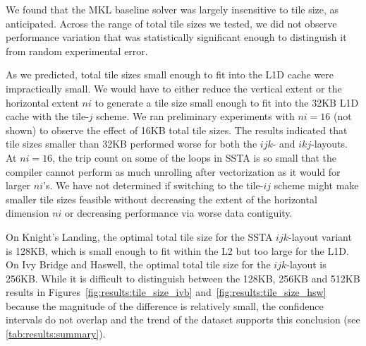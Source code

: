\documentclass{sig-alternate-05-2015}
\begin{document}
We found that the MKL baseline solver was largely insensitive to tile size, as
  anticipated.
Across the range of total tile sizes we tested, we did not observe performance
  variation that was statistically significant enough to distinguish it from
  random experimental error.

As we predicted, total tile sizes small enough to fit into the L1D cache were
  impractically small.
We would have to either reduce the vertical extent or the horizontal
  extent \(ni\) to generate a tile size small enough to fit into the 32KB L1D
  cache with the tile-\(j\) scheme.
We ran preliminary experiments with \(ni=16\) (not shown) to observe the effect
  of 16KB total tile sizes.
The results indicated that tile sizes smaller than 32KB performed worse for both
  the \(ijk\)- and \(ikj\)-layouts.
At \(ni=16\), the trip count on some of the loops in SSTA is so small that the
  compiler cannot perform as much unrolling after vectorization as it would for
  larger \(ni\)'s.
We have not determined if switching to the tile-\(ij\) scheme might make
  smaller tile sizes feasible without decreasing the extent of the horizontal
  dimension \(ni\) or decreasing performance via worse data contiguity.


On Knight's Landing, the optimal total tile size for the SSTA \(ijk\)-layout
  variant is 128KB, which is small enough to fit within the L2 but too large
  for the L1D. 
On Ivy Bridge and Haswell, the optimal total tile size for the \(ijk\)-layout 
  is 256KB.
While it is difficult to distinguish between the 128KB, 256KB and 512KB results
  in Figures~\ref{fig:results:tile_size_ivb} and~\ref{fig:results:tile_size_hsw}
  because the magnitude of the difference is relatively small, the confidence
  intervals do not overlap and the trend of the dataset supports this conclusion
  (see \ref{tab:results:summary}).
\end{document}

